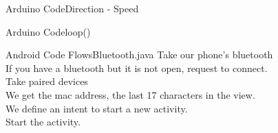 \documentclass[xcolor=table, 9pt]{beamer}
\begin{document}
\begin{frame}{Arduino Code}{Direction - Speed}
\begin{block}{}
\lstIII
\end{block}
\end{frame}

\begin{frame}{Arduino Code}{loop()}
\begin{block}{}
\lstIIII
\end{block}
\end{frame}




\begin{frame}{Android Code Flows}{Bluetooth.java}
{} Take our phone's bluetooth\\
\vspace{0.3cm}
{} If you have a bluetooth but it is not open, request to connect.\\
\vspace{0.3cm}
{} Take paired devices\\
\vspace{0.3cm}
{} We get the mac address, the last 17 characters in the view.\\
\vspace{0.3cm}
{} We define an intent to start a new activity.\\
\vspace{0.3cm}
{} Start the activity.
\end{frame}
\end{document}
